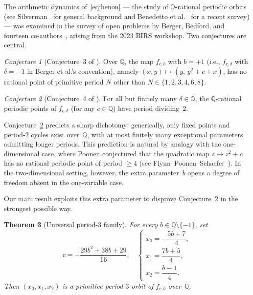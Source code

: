 \documentclass[11pt]{article}
\newtheorem{theorem}{Theorem}[section]
\theoremstyle{definition}
\theoremstyle{remark}
\newtheorem{conjecture}[theorem]{Conjecture}
\begin{document}
The arithmetic dynamics of~\eqref{eq:henon} --- the study of $\mathbb{Q}$-rational
periodic orbits (see Silverman~\cite{silverman2007} for general background and
Benedetto et al.~\cite{benedetto2019} for a recent survey) ---
was examined in the survey of open problems by Berger, Bedford,
and fourteen co-authors~\cite{berger2024}, arising from the 2023 BIRS workshop.
Two conjectures are central.

\begin{conjecture}[{Conjecture~3 of \cite{berger2024}}]\label{conj:3}
  Over $\mathbb{Q}$, the map $f_{c,b}$ with $b = +1$
  (i.e., $f_{c,\delta}$ with $\delta = -1$ in Berger et al.'s convention),
  namely $(x,y) \mapsto (y,\, y^2 + c + x)$,
  has no rational point of primitive period $N$ other than $N \in \{1, 2, 3, 4, 6, 8\}$.
\end{conjecture}

\begin{conjecture}[{Conjecture~4 of \cite{berger2024}}]\label{conj:4}
  For all but finitely many $\delta \in \mathbb{Q}$, the $\mathbb{Q}$-rational periodic
  points of $f_{c,\delta}$ (for any $c \in \mathbb{Q}$) have period dividing~$2$.
\end{conjecture}

Conjecture~\ref{conj:4} predicts a sharp dichotomy: generically, only fixed points
and period-$2$ cycles exist over~$\mathbb{Q}$, with at most finitely many exceptional
parameters admitting longer periods.  This prediction is natural by analogy with
the one-dimensional case, where Poonen conjectured that the quadratic map
$z \mapsto z^2 + c$ has no rational periodic point of period $\geq 4$
(see Flynn--Poonen--Schaefer~\cite{flynnpoonenschaefer1997}).
In the two-dimensional setting, however, the extra parameter~$b$ opens a degree of
freedom absent in the one-variable case.

Our main result exploits this extra parameter to disprove Conjecture~\ref{conj:4}
in the strongest possible way.

\begin{theorem}[Universal period-3 family]\label{thm:main}
  For every $b \in \mathbb{Q} \setminus \{-1\}$, set
  \begin{equation}\label{eq:family}
    c = -\frac{29b^2 + 38b + 29}{16}, \quad
    \begin{cases}
      x_0 = -\dfrac{5b+7}{4},\\[6pt]
      x_1 = \dfrac{7b+5}{4},\\[6pt]
      x_2 = \dfrac{b-1}{4}.
    \end{cases}
  \end{equation}
  Then $(x_0, x_1, x_2)$ is a primitive period-$3$ orbit of
  $f_{c,b}$ over~$\mathbb{Q}$.
\end{theorem}
\end{document}
